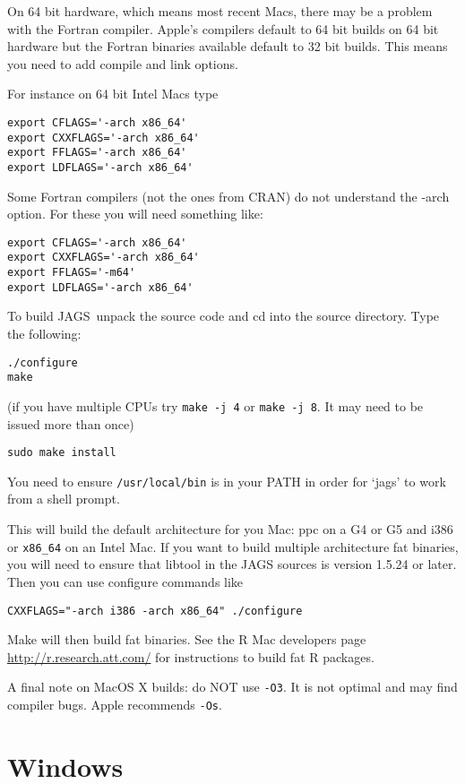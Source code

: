 \documentclass[11pt, a4paper, titlepage]{article}
\newcommand{\JAGS}{\textsf{JAGS}}
\begin{document}
On 64 bit hardware, which means most recent Macs, there may be a 
problem with the Fortran compiler.  Apple's compilers default to 64 bit 
builds on 64 bit hardware but the Fortran binaries available default to 
32 bit builds. This means you need to add compile and link options.

For instance on 64 bit Intel Macs type
\begin{verbatim}
export CFLAGS='-arch x86_64'
export CXXFLAGS='-arch x86_64'
export FFLAGS='-arch x86_64'
export LDFLAGS='-arch x86_64'
\end{verbatim}

Some Fortran compilers (not the ones from CRAN) do not understand 
the -arch option. For these you will need something like:
\begin{verbatim}
export CFLAGS='-arch x86_64'
export CXXFLAGS='-arch x86_64'
export FFLAGS='-m64'
export LDFLAGS='-arch x86_64'
\end{verbatim}

To build \JAGS\ unpack the source code and cd into the source  
directory. Type the following:
\begin{verbatim}
./configure
make
\end{verbatim}
(if you have multiple CPUs try \verb+make -j 4+ or
\verb+make -j 8+. It may need to be issued more than once)
\begin{verbatim}
sudo make install
\end{verbatim}

You need to ensure \texttt{/usr/local/bin} is in your PATH in order
for `jags' to work from a shell prompt.

This will build the default architecture for you Mac: ppc on a G4 or
G5 and i386 or \verb+x86_64+ on an Intel Mac.  If you want to build
multiple architecture fat binaries, you will need to ensure that
libtool in the JAGS sources is version 1.5.24 or later.  Then you can
use configure commands like
\begin{verbatim}
CXXFLAGS="-arch i386 -arch x86_64" ./configure
\end{verbatim}

Make will then build fat binaries.  See the R Mac developers page 
\url{http://r.research.att.com/} for instructions to build fat R packages.

A final note on MacOS X builds: do NOT use \texttt{-O3}.  It is not optimal 
and may find compiler bugs.  Apple recommends \texttt{-Os}.

\clearpage
\section{Windows}
\label{section:windows}
\end{document}
